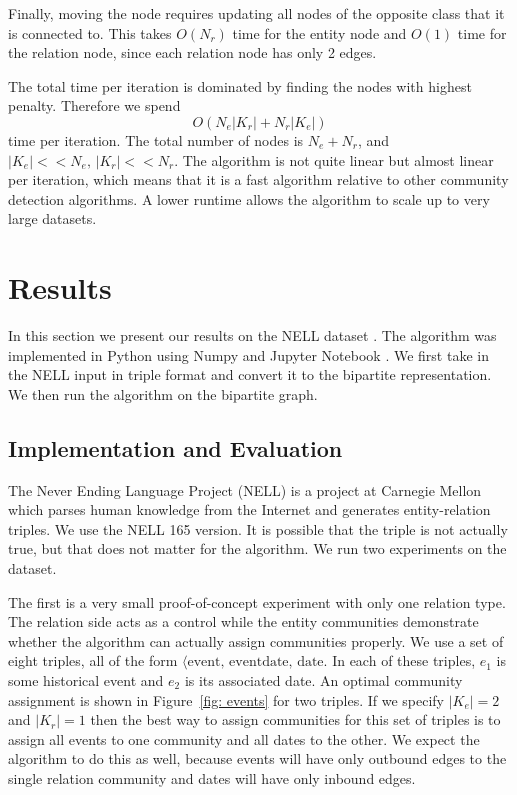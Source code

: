 \documentclass[12pt]{article}
\begin{document}
Finally, moving the node requires updating all nodes of the opposite class that
it is connected to. This takes $O(N_r)$ time for the entity node and $O(1)$ time
for the relation node, since each relation node has only 2 edges.

The total time per iteration is dominated by finding the nodes with highest
penalty. Therefore we spend $$O(N_e|K_r| + N_r|K_e|)$$ time per iteration.
The total number of nodes is $N_e + N_r$, and $|K_e| << N_e,\,|K_r| << N_r$.
The algorithm is not quite linear but almost linear per iteration, which means
that it is a fast algorithm relative to other community detection algorithms.
A lower runtime allows the algorithm to scale up to very large datasets.

\section{Results}
\label{Results}

In this section we present our results on the NELL dataset \cite{Carlson2010}.
The algorithm was implemented in Python using Numpy \cite{Jones2001} and Jupyter
Notebook \cite{Perez2007}. We first take in the NELL input in triple format and
convert it to the bipartite representation. We then run the algorithm on the
bipartite graph.

\subsection{Implementation and Evaluation}
\label{Implementation and Evaluation}

The Never Ending Language Project (NELL) is a project at Carnegie Mellon which
parses human knowledge from the Internet and generates entity-relation triples.
We use the NELL 165 version. It is possible that the triple is not actually
true, but that does not matter for the algorithm. We run two experiments on the
dataset.

The first is a very small proof-of-concept experiment with only one relation
type. The relation side acts as a control while the entity communities
demonstrate whether the algorithm can actually assign communities properly. We
use a set of eight triples, all of the form $\langle \text{event},
\,\text{eventdate}, \,\text{date}$. In each of these triples, $e_1$ is some
historical event and $e_2$ is its associated date. An optimal community
assignment is shown in Figure~\ref{fig: events} for two triples. If we specify
$|K_e| = 2$ and $|K_r|=1$ then the best way to assign communities for this set of
triples is to assign all events to one community and all dates to the other. We
expect the algorithm to do this as well, because events will have only outbound
edges to the single relation community and dates will have only inbound edges.
\end{document}
